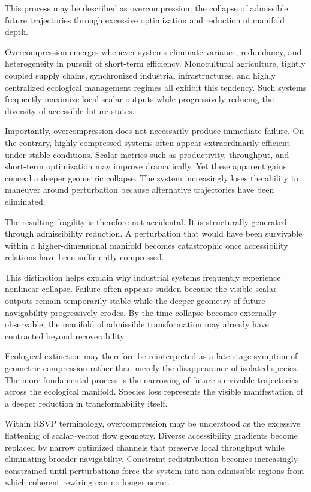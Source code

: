 \documentclass[11pt,a4paper]{article}
\begin{document}
This process may be described as overcompression: the collapse of admissible future trajectories through excessive optimization and reduction of manifold depth.

Overcompression emerges whenever systems eliminate variance, redundancy, and heterogeneity in pursuit of short-term efficiency. Monocultural agriculture, tightly coupled supply chains, synchronized industrial infrastructures, and highly centralized ecological management regimes all exhibit this tendency. Such systems frequently maximize local scalar outputs while progressively reducing the diversity of accessible future states.

Importantly, overcompression does not necessarily produce immediate failure. On the contrary, highly compressed systems often appear extraordinarily efficient under stable conditions. Scalar metrics such as productivity, throughput, and short-term optimization may improve dramatically. Yet these apparent gains conceal a deeper geometric collapse. The system increasingly loses the ability to maneuver around perturbation because alternative trajectories have been eliminated.

The resulting fragility is therefore not accidental. It is structurally generated through admissibility reduction. A perturbation that would have been survivable within a higher-dimensional manifold becomes catastrophic once accessibility relations have been sufficiently compressed.

This distinction helps explain why industrial systems frequently experience nonlinear collapse. Failure often appears sudden because the visible scalar outputs remain temporarily stable while the deeper geometry of future navigability progressively erodes. By the time collapse becomes externally observable, the manifold of admissible transformation may already have contracted beyond recoverability.

Ecological extinction may therefore be reinterpreted as a late-stage symptom of geometric compression rather than merely the disappearance of isolated species. The more fundamental process is the narrowing of future survivable trajectories across the ecological manifold. Species loss represents the visible manifestation of a deeper reduction in transformability itself.

Within RSVP terminology, overcompression may be understood as the excessive flattening of scalar--vector flow geometry. Diverse accessibility gradients become replaced by narrow optimized channels that preserve local throughput while eliminating broader navigability. Constraint redistribution becomes increasingly constrained until perturbations force the system into non-admissible regions from which coherent rewiring can no longer occur.
\end{document}
